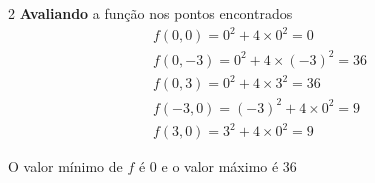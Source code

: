 \documentclass[a4paper,12pt,fleqn]{article}
\begin{document}
\begin{answer}
\begin{multicols*}{2}
  \textbf{Avaliando} a função nos pontos encontrados
  \begin{gather*}
    f(0, 0)  =    0^2 + 4\times    0^2 = 0 \\
    f(0, -3) =    0^2 + 4\times (-3)^2 = 36 \\
    f(0, 3)  =    0^2 + 4\times    3^2 = 36 \\
    f(-3, 0) = (-3)^2 + 4\times    0^2 = 9 \\
    f(3, 0)  =    3^2 + 4\times    0^2 = 9
  \end{gather*}

  O valor mínimo de $f$ é 0 e o valor máximo é 36
\end{multicols*}
\end{answer}

\end{document}

